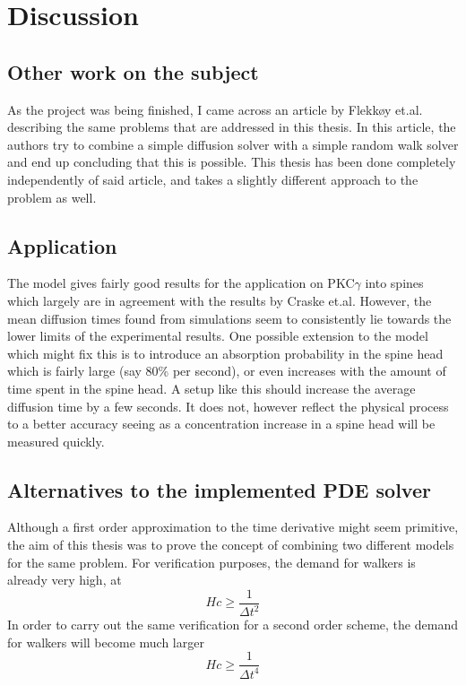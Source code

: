 \section{Discussion}

\subsection{Other work on the subject}

As the project was being finished, I came across an article by Flekkøy et.al.\cite{flekkoy2001coupling} describing the same problems that are addressed in this thesis. 
In this article, the authors try to combine a simple diffusion solver with a simple random walk solver and end up concluding that this is possible. 
This thesis has been done completely independently of said article, and takes a slightly different approach to the problem as well.

\subsection{Application}

The model gives fairly good results for the application on PKC$\gamma$ into spines which largely are in agreement with the results by Craske et.al. 
However, the mean diffusion times found from simulations seem to consistently lie towards the lower limits of the experimental results. 
One possible extension to the model which might fix this is to introduce an absorption probability in the spine head which is fairly large (say 80\% per second), or even increases with the amount of time spent in the spine head. 
A setup like this should increase the average diffusion time by a few seconds. 
It does not, however reflect the physical process to a better accuracy seeing as a concentration increase in a spine head will be measured quickly.

\subsection{Alternatives to the implemented PDE solver}
Although a first order approximation to the time derivative might seem primitive, the aim of this thesis was to prove the concept of combining two different models for the same problem. 
For verification purposes, the demand for walkers is already very high, at
\begin{equation*}
 Hc \geq \frac{1}{\Delta t^2}
\end{equation*}
In order to carry out the same verification for a second order scheme, the demand for walkers will become much larger
\begin{equation*}
 Hc \geq \frac{1}{\Delta t^4}
\end{equation*}

